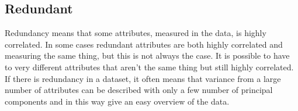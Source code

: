 \subsection*{Redundant}
Redundancy means that some attributes, measured in the data, is highly correlated. 
In some cases redundant attributes are both highly correlated and measuring the same thing, but this is not always the case. It is possible to have to very different attributes that aren't the same thing but still highly correlated. \blankline
%
If there is redundancy in a dataset, it often means that variance from a large number of attributes can be described with only a few number of principal components and in this way give an easy overview of the data. 